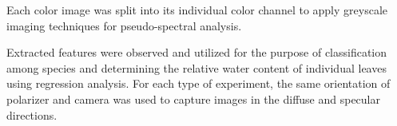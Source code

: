 Each color image was split into its individual color channel to apply greyscale imaging techniques for pseudo-spectral analysis.

Extracted features were observed and utilized for the purpose of classification among species and determining the relative water content of individual leaves using regression analysis.  For each type of experiment, the same orientation of polarizer and camera was used to capture images in the diffuse and specular directions.
